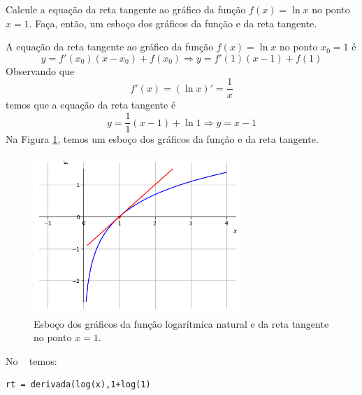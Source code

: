 \cleardoublepage\documentclass[../main.tex]{subfiles}
\begin{document}
\begin{exeresol}
  Calcule a equação da reta tangente ao gráfico da função $f(x) = \ln x$ no ponto $x=1$. Faça, então, um esboço dos gráficos da função e da reta tangente.
\end{exeresol}
\begin{resol}
  A equação da reta tangente ao gráfico da função $f(x) = \ln x$ no ponto $x_0=1$ é
  \begin{equation*}
    y = f'(x_0)(x-x_0)+f(x_0) \Rightarrow y = f'(1)(x-1)+f(1)
  \end{equation*}
  Observando que
  \begin{equation*}
    f'(x) = (\ln x)' = \frac{1}{x}
  \end{equation*}
  temos que a equação da reta tangente é
  \begin{equation*}
    y = \frac{1}{1}(x-1)+\ln 1 \Rightarrow y = x-1
  \end{equation*}
  Na Figura \ref{fig:deriv_exeresol_rt_ln}, temos um esboço dos gráficos da função e da reta tangente.

  \begin{figure}[H]
    \centering
    \includegraphics[width=0.7\textwidth]{fig_deriv/fig_deriv_exeresol_rt_ln}
    \caption{Esboço dos gráficos da função logarítmica natural e da reta tangente no ponto $x=1$.}
    \label{fig:deriv_exeresol_rt_ln}
  \end{figure}

  
  No \geogebra~ temos:
\begin{verbatim}
rt = derivada(log(x),1+log(1)
\end{verbatim}
\end{resol}
\end{document}
